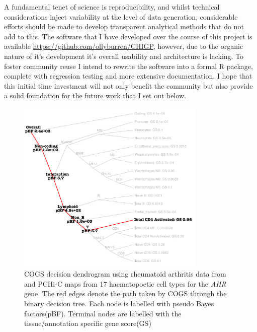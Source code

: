 \documentclass[a4paper,11pt]{report}
\begin{document}
A fundamental tenet of science is reproducibility, and whilst technical considerations inject variability at the level of data generation, considerable efforts should be made to develop transparent analytical methods that do not add to this. The software that I have developed over the course of this project is available \url{https://github.com/ollyburren/CHIGP}, however, due to the organic nature of it's development it's overall usability and architecture is lacking. To foster community reuse I intend to rewrite the software into a formal R package, complete with regression testing and more extensive documentation. I hope that this initial time investment will not only benefit the community but also provide a solid foundation for the future work that I set out below. 


\begin{figure}[ht]
\centering
\includegraphics[width=0.8\textwidth]{AHR_dend.pdf}
\caption{COGS decision dendrogram using rheumatoid arthritis data from \citet{Okada2014-um} and PCHi-C maps from 17 haematopoetic cell types for the \textit{AHR} gene. The red edges denote the path taken by COGS through the binary decision tree. Each node is labelled with pseudo Bayes factors(pBF). Terminal nodes are labelled with the tissue/annotation specific gene score(GS) }
\label{fig:AHR_dend}
\end{figure}
\end{document}
